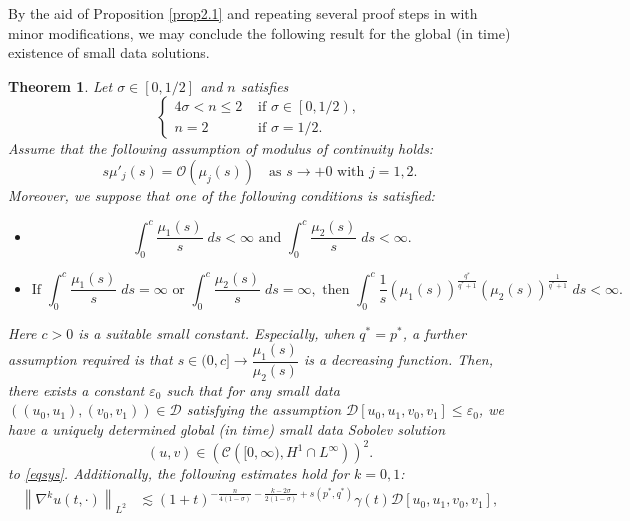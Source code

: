 \documentclass[11pt,reqno]{amsart}
\newcommand{\di}{\displaystyle}
\newcommand{\tron}[1]{\left( #1 \right)}
\numberwithin{equation}{section}
\newtheorem{theorem}{Theorem}[section]
\theoremstyle{plain}
\begin{document}
By the aid of Proposition \ref{prop2.1} and repeating several proof steps in \cite{AnhRei2021} with minor modifications, we may conclude the following result for the global (in time) existence of small data solutions.
\begin{theorem}\label{thr2.1}
    Let $\sigma\in \left[0,1/2\right]$ and $n$ satisfies
    \[
\begin{cases}
    4\sigma<n\leq 2 &\text{ if }\sigma\in \left[0,1/2\right),\\
    n= 2 &\text{ if }\sigma=1/2.
\end{cases}
    \]
    Assume that the following assumption of modulus of continuity holds:
    \begin{equation}\label{con1thr2.1}
        s\mu'_{j}(s)=\mathcal{O}(\mu_j(s))\quad \text{as $s\to +0$ with $j=1,2$.}
    \end{equation}
    Moreover, we suppose that one of the following conditions is satisfied:
    \begin{itemize}
        \item[\rm i)] 
        \begin{equation}\label{con2thr2.1}
            \di\int_{0}^c\frac{\mu_1(s)}{s}\;ds<\infty \text{ and }\di\int_{0}^c\frac{\mu_2(s)}{s}\;ds<\infty.
        \end{equation}
        \item[\rm ii)] 
        \begin{equation}\label{con3thr2.1}
            \text{If }\di\int_{0}^c\frac{\mu_1(s)}{s}\;ds=\infty \text{ or } \di\int_{0}^c\frac{\mu_2(s)}{s}\;ds=\infty, \text{ then } \di\int_{0}^c\frac{1}{s}\tron{\mu_1(s)}^{\frac{q^*}{q^*+1}}\tron{\mu_2(s)}^{\frac{1}{q^*+1}}\;ds<\infty.
    \end{equation}
    \end{itemize}
    Here $c>0$ is a suitable small constant. Especially, when $q^*=p^*$, a further assumption required is that $s \in(0, c] \rightarrow \dfrac{\mu_1(s)}{\mu_2(s)}$ is a decreasing function. Then, there exists a constant $\varepsilon_0$ such that for any small data $\left(\left(u_0, u_1\right),\left( v_0, v_1\right)\right) \in \mathcal{D}$ satisfying the assumption $\mathcal{D}[u_0,u_1,v_0,v_1]\leq\varepsilon_0$, we have a uniquely determined global (in time) small data Sobolev solution
$$
(u, v) \in\left(\mathcal{C}\left([0, \infty),H^1\cap L^{\infty}\right)\right)^2.
$$
to \eqref{eqsys}. Additionally, the following estimates hold for $k=0,1$:
$$
\begin{aligned}
\left\|\nabla^{k} u(t, \cdot)\right\|_{L^2} & \lesssim (1+t)^{-\frac{n}{4(1-\sigma)}-\frac{k-2\sigma}{2(1-\sigma)}+s\left(p^*, q^*\right)}\gamma(t)\mathcal{D}[u_0,u_1,v_0,v_1],\\

\end{aligned}$$
\end{theorem}
\end{document}
